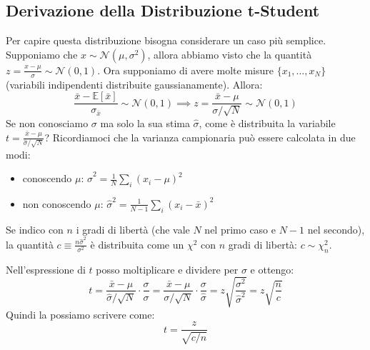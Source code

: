 \documentclass[openany,a4paper,12pt]{book}
\theoremstyle{remark}
\begin{document}
\subsection{Derivazione della Distribuzione t-Student}
Per capire questa distribuzione bisogna considerare un caso più semplice. Supponiamo che $x \sim \mathcal{N}(\mu, \sigma^2)$, allora abbiamo visto che la quantità $z = \frac{x-\mu}{\sigma} \sim \mathcal{N}(0,1)$.
Ora supponiamo di avere molte misure $\{x_1, \dots, x_N\}$ (variabili indipendenti distribuite gaussianamente). Allora:
$$ \frac{\bar{x} - \mathbb{E}[\bar{x}]}{\sigma_{\bar{x}}} \sim \mathcal{N}(0,1) \implies z = \frac{\bar{x}-\mu}{\sigma/\sqrt{N}} \sim \mathcal{N}(0,1) $$
Se non conosciamo $\sigma$ ma solo la sua stima $\hat{\sigma}$, come è distribuita la variabile $t = \frac{\bar{x}-\mu}{\hat{\sigma}/\sqrt{N}}$?
Ricordiamoci che la varianza campionaria può essere calcolata in due modi:
\begin{itemize}
    \item conoscendo $\mu$: $\hat{\sigma}^2 = \frac{1}{N} \sum_{i} (x_i - \mu)^2$
    \item non conoscendo $\mu$: $\hat{\sigma}^2 = \frac{1}{N-1} \sum_{i} (x_i - \bar{x})^2$
\end{itemize}
Se indico con $n$ i gradi di libertà (che vale $N$ nel primo caso e $N-1$ nel secondo), la quantità $c \equiv \frac{n \hat{\sigma}^2}{\sigma^2}$ è distribuita come un $\chi^2$ con $n$ gradi di libertà: $c \sim \chi^2_n$. 

Nell'espressione di $t$ posso moltiplicare e dividere per $\sigma$ e ottengo:
$$ t = \frac{\bar{x}-\mu}{\hat{\sigma}/\sqrt{N}} \cdot \frac{\sigma}{\sigma} = \frac{\bar{x}-\mu}{\sigma/\sqrt{N}} \cdot \frac{\sigma}{\hat{\sigma}} = z \sqrt{\frac{\sigma^2}{\hat{\sigma}^2}} = z \sqrt{\frac{n}{c}} $$
Quindi la possiamo scrivere come:
\begin{equation}
    t = \frac{z}{\sqrt{c/n}} \label{eq:t_def}
\end{equation}
\end{document}
